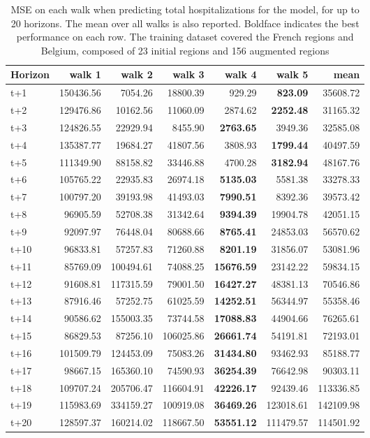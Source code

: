 \begin{table}[H]
\centering
\caption{MSE on each walk when predicting total hospitalizations for the model, for up to 20 horizons. The mean over all walks is also reported. Boldface indicates the best performance on each row. The training dataset covered the French regions and Belgium, composed of 23 initial regions and 156 augmented regions }
\label{tab:MSE_walk_dense_model}
\begin{tabular}{lrrrrrr}
\toprule
Horizon &    walk 1 &    walk 2 &    walk 3 &   walk 4 &    walk 5 &      mean \\
\midrule
t+1  & 150436.56  & 7054.26  & 18800.39  & 929.29  & \textbf{823.09}  & 35608.72  \\
t+2  & 129476.86  & 10162.56  & 11060.09  & 2874.62  & \textbf{2252.48}  & 31165.32  \\
t+3  & 124826.55  & 22929.94  & 8455.90  & \textbf{2763.65}  & 3949.36  & 32585.08  \\
t+4  & 135387.77  & 19684.27  & 41807.56  & 3808.93  & \textbf{1799.44}  & 40497.59  \\
t+5  & 111349.90  & 88158.82  & 33446.88  & 4700.28  & \textbf{3182.94}  & 48167.76  \\
t+6  & 105765.22  & 22935.83  & 26974.18  & \textbf{5135.03}  & 5581.38  & 33278.33  \\
t+7  & 100797.20  & 39193.98  & 41493.03  & \textbf{7990.51}  & 8392.36  & 39573.42  \\
t+8  & 96905.59  & 52708.38  & 31342.64  & \textbf{9394.39}  & 19904.78  & 42051.15  \\
t+9  & 92097.97  & 76448.04  & 80688.66  & \textbf{8765.41}  & 24853.03  & 56570.62  \\
t+10  & 96833.81  & 57257.83  & 71260.88  & \textbf{8201.19}  & 31856.07  & 53081.96  \\
t+11  & 85769.09  & 100494.61  & 74088.25  & \textbf{15676.59}  & 23142.22  & 59834.15  \\
t+12  & 91608.81  & 117315.59  & 79001.50  & \textbf{16427.27}  & 48381.13  & 70546.86  \\
t+13  & 87916.46  & 57252.75  & 61025.59  & \textbf{14252.51}  & 56344.97  & 55358.46  \\
t+14  & 90586.62  & 155003.35  & 73744.58  & \textbf{17088.83}  & 44904.66  & 76265.61  \\
t+15  & 86829.53  & 87256.10  & 106025.86  & \textbf{26661.74}  & 54191.81  & 72193.01  \\
t+16  & 101509.79  & 124453.09  & 75083.26  & \textbf{31434.80}  & 93462.93  & 85188.77  \\
t+17  & 98667.15  & 165360.10  & 74590.93  & \textbf{36254.39}  & 76642.98  & 90303.11  \\
t+18  & 109707.24  & 205706.47  & 116604.91  & \textbf{42226.17}  & 92439.46  & 113336.85  \\
t+19  & 115983.69  & 334159.27  & 100919.08  & \textbf{36469.26}  & 123018.61  & 142109.98  \\
t+20  & 128597.37  & 160214.02  & 118667.50  & \textbf{53551.12}  & 111479.57  & 114501.92  \\

\bottomrule
\end{tabular}
\end{table}
